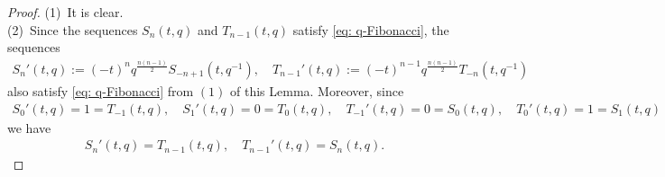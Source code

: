 \documentclass[10pt,a4paper]{amsart}
\begin{document}
\begin{proof}
(1)\ It is clear. \\
(2)\ 
Since the sequences $S_n(t,q)$ and $T_{n-1}(t,q)$ satisfy \eqref{eq: q-Fibonacci}, the sequences 
\begin{align*}
S_n'(t,q):=(-t)^{n}q^\frac{n(n-1)}{2}S_{-n+1}\left(t,q^{-1}\right),\quad T_{n-1}'(t,q):=(-t)^{n-1}q^\frac{n(n-1)}{2}T_{-n}\left(t,q^{-1}\right)
\end{align*}
also satisfy \eqref{eq: q-Fibonacci} from $(1)$ of this Lemma. 
Moreover, since 
\begin{align*}
S_0'(t,q)=1=T_{-1}(t,q), \quad S_1'(t,q)=0=T_0(t,q),\quad T_{-1}'(t,q)=0=S_0(t,q), \quad T_{0}'(t,q)=1=S_1(t,q)
\end{align*}
we have
\begin{align*}
S_n'(t,q)=T_{n-1}(t,q),\quad T_{n-1}'(t,q)=S_n(t,q). 
\end{align*}
\end{proof}
\end{document}
